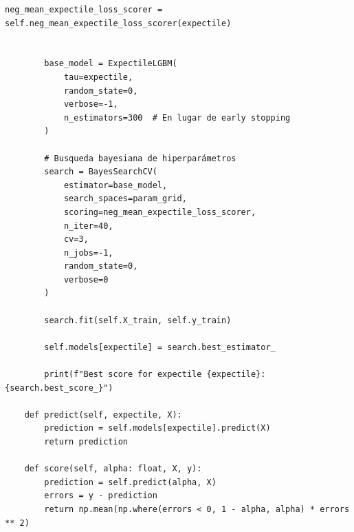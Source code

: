 \documentclass[11pt]{book}
\theoremstyle{plain} %
\theoremstyle{definition} %
\begin{document}
\begin{lstlisting}[style=pythonstyle, caption=expectileboosting.py]
        neg_mean_expectile_loss_scorer = self.neg_mean_expectile_loss_scorer(expectile)


        base_model = ExpectileLGBM(
            tau=expectile,
            random_state=0,
            verbose=-1,
            n_estimators=300  # En lugar de early stopping
        )

        # Busqueda bayesiana de hiperparámetros
        search = BayesSearchCV(
            estimator=base_model,
            search_spaces=param_grid,
            scoring=neg_mean_expectile_loss_scorer,
            n_iter=40,
            cv=3,
            n_jobs=-1,
            random_state=0,
            verbose=0
        )

        search.fit(self.X_train, self.y_train)

        self.models[expectile] = search.best_estimator_

        print(f"Best score for expectile {expectile}: {search.best_score_}")

    def predict(self, expectile, X): 
        prediction = self.models[expectile].predict(X)
        return prediction

    def score(self, alpha: float, X, y):
        prediction = self.predict(alpha, X)
        errors = y - prediction
        return np.mean(np.where(errors < 0, 1 - alpha, alpha) * errors ** 2)
 \end{lstlisting}
\end{document}
